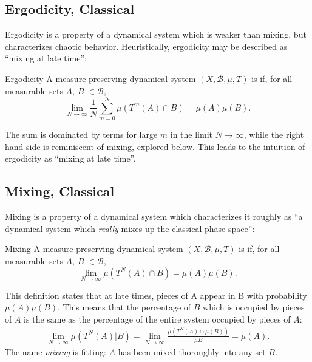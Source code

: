 \subsection{Ergodicity, Classical}
Ergodicity is a property of a dynamical system which is weaker than mixing, but characterizes chaotic behavior.
%
Heuristically, ergodicity may be described as ``mixing at late time'':
%
\begin{definition}{Ergodicity}{}
A measure preserving dynamical system \((X, \mathcal{B}, \mu, T)\) is  if, for all measurable sets \(A\), \(B\) \(\in \mathcal{B}\), 
\begin{equation}
     \lim_{N\to \infty} \frac{1}{N} \sum_{m = 0}^{N} \mu(T^m(A) \cap B) = \mu(A) \mu(B)
     .
\end{equation}

\end{definition}

The sum is dominated by terms for large \(m\) in the limit \(N \to \infty\), while the right hand side is reminiscent of mixing, explored below.
%
This leads to the intuition of ergodicity as ``mixing at late time''.

\subsection{Mixing, Classical}
\label{glossary:mixing}
Mixing is a property of a dynamical system which characterizes it roughly as ``a dynamical system which \textit{really} mixes up the classical phase space'':
%
\begin{definition}{Mixing}{}
A measure preserving dynamical system \((X, \mathcal{B}, \mu, T)\) is  if, for all measurable sets \(A\), \(B\) \(\in \mathcal{B}\),
\begin{equation}
    \lim_{N\to\infty} \mu(T^N(A) \cap B) = \mu(A) \mu(B)
    .
\end{equation}
\end{definition}

This definition states that at late times, pieces of A appear in B with probability \(\mu(A) \mu(B)\).
%
This means that the percentage of \(B\) which is occupied by pieces of \(A\) is  the same as the percentage of the entire system occupied by pieces of \(A\):
\begin{align}
    \lim_{N\to \infty} \mu(T^N(A) | B) = \lim_{N\to \infty}  \frac{\mu(T^N(A) \cap \mu(B))}{\mu{B}} = \mu(A)
    .
\end{align}
%
The name \textit{mixing} is fitting: \(A\) has been mixed thoroughly into any set \(B\).

